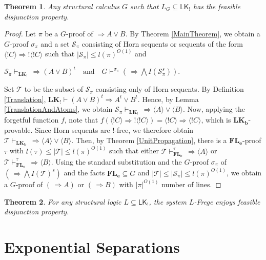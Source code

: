\documentclass[12pt,a4paper]{article}
\theoremstyle{plain}
\newtheorem{theorem}{Theorem}
\theoremstyle{definition}
\newcommand{\LKb}{\mathbf{LK_b}}
\newcommand{\LKajab}{\mathbf{LK_!}}
\begin{document}
\begin{theorem} \label{FeasibleDP}
Any structural calculus $G$ such that $L_G \subseteq \mathsf{LK_!}$ has the feasible disjunction property. 
\end{theorem}
\begin{proof}
Let $\pi$ be a $G$-proof of $\Rightarrow A \vee B$. By Theorem \ref{MainTheorem}, we obtain a $G$-proof $\sigma_{\pi}$ and a set $\mathcal{S}_{\pi}$ consisting of Horn sequents or sequents of the form $\langle !C \rangle \Rightarrow !\langle !C \rangle$ such that $|\mathcal{S}_{\pi}| \leq l(\pi)^{O(1)}$ and
\begin{center}
    $\mathcal{S}_{\pi} \vdash_{\LKajab} \, \Rightarrow (A \vee B)^t
    \quad \text{and} \quad
    G \vdash^{\sigma_{\pi}} (\, \Rightarrow \bigwedge I(\mathcal{S}_{\pi}^s))$.
\end{center}
Set $\mathcal{T}$ to be the subset of $\mathcal{S}_{\pi}$ consisting only of Horn sequents. By Definition \ref{Translation}, $\LKajab \vdash (A \vee B)^t \Rightarrow A^t \vee B^t$. Hence, by Lemma \ref{TranslationAndAtoms}, we obtain
$\mathcal{S}_{\pi} \vdash_{\LKajab} \, \Rightarrow \langle A \rangle \vee \langle B \rangle$.
Now, applying the forgetful function $f$, note that
$f(\langle !C \rangle \Rightarrow !\langle !C \rangle)
= \langle !C \rangle \Rightarrow \langle !C \rangle$,
which is $\LKb$-provable. Since Horn sequents are $!$-free, we therefore obtain
$\mathcal{T} \vdash_{\LKb} \, \Rightarrow \langle A \rangle \vee \langle B \rangle$.
Then, by Theorem \ref{UnitPropagation}, there is a $\mathbf{FL_e}$-proof $\tau$ with
$l(\tau) \leq |\mathcal{T}| \leq l(\pi)^{O(1)}$ such that either
    $\mathcal{T} \vdash_{\mathbf{FL_e}}^{\tau} \, \Rightarrow \langle A \rangle$
   or
    $\mathcal{T} \vdash_{\mathbf{FL_e}}^{\tau} \, \Rightarrow \langle B \rangle$.
Using the standard substitution and the $G$-proof $\sigma_{\pi}$ of
$(\, \Rightarrow \bigwedge I(\mathcal{T})^s)$ and the facts $\mathbf{FL_e}\subseteq G$ and $|\mathcal{T}|\leq |\mathcal{S}_{\pi}| \leq l(\pi)^{O(1)}$, we obtain a $G$-proof of $(\, \Rightarrow A)$ or $(\, \Rightarrow B)$ with $|\pi|^{O(1)}$ number of lines.
\end{proof}

\begin{theorem}\label{Thm: MainFrege}
For any structural logic $L \subseteq \mathsf{LK_!}$, the system $L$-Frege enjoys feasible disjunction property.
\end{theorem}

\section{Exponential Separations}
\end{document}
